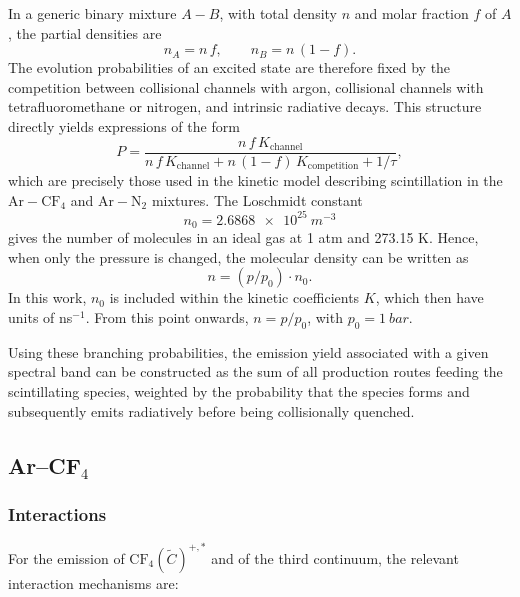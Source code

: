 \documentclass[12pt,a4paper]{article}
\newcommand{\N}{\mathrm{N}}
\newcommand{\Ar}{\mathrm{Ar}}
\newcommand{\CF}{\mathrm{CF}}
\begin{document}
In a generic binary mixture $A-B$, with total density $n$ and molar fraction $f$ of $A$, the partial densities are
\begin{equation}
    n_{A}=n\,f,
    \qquad
    n_{B}=n\,(1-f).
\end{equation}
The evolution probabilities of an excited state are therefore fixed by the competition between collisional channels with argon, collisional channels with tetrafluoromethane or nitrogen, and intrinsic radiative decays. This structure directly yields expressions of the form
\begin{equation}
    P
    =
    \frac{n\,f\,K_{\text{channel}}}
    {n\,f\,K_{\text{channel}}
    +
    n\,(1-f)\,K_{\text{competition}}
    +
    1/\tau},
    \label{eq:generic_probability_binary_mixture}
\end{equation}
which are precisely those used in the kinetic model describing scintillation in the $\Ar-\CF_4$ and $\Ar-\N_2$ mixtures. The Loschmidt constant
\begin{equation*}
 n_0 = \SI{2.6868e25}{m^{-3}}
\end{equation*}
gives the number of molecules in an ideal gas at 1 atm and 273.15 K. Hence, when only the pressure is changed, the molecular density can be written as
\begin{equation*}
 n = (p/p_0) \cdot n_0.
\end{equation*}
In this work, $n_0$ is included within the kinetic coefficients $K$, which then have units of ns$^{-1}$. From this point onwards, $n=p/p_0$, with $p_0=\SI{1}{bar}$.

Using these branching probabilities, the emission yield associated with a given spectral band can be constructed as the sum of all production routes feeding the scintillating species, weighted by the probability that the species forms and subsequently emits radiatively before being collisionally quenched.

\subsection{Ar--CF$_4$} \label{subbsec:kinArCF4}

\subsubsection{Interactions}

For the emission of $\CF_4(\tilde{C})^{+,*}$ and of the third continuum, the relevant interaction mechanisms are:
\end{document}

